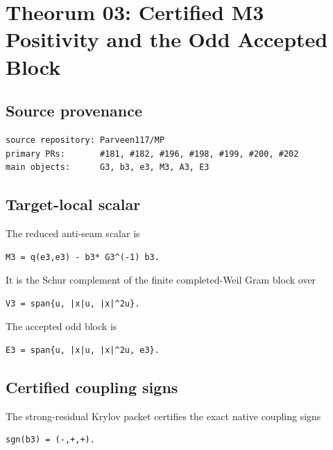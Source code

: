 \hypertarget{theorum-03-certified-m3-positivity-and-the-odd-accepted-block}{%
\chapter{Theorum 03: Certified M3 Positivity and the Odd Accepted Block}\label{theorum-03-certified-m3-positivity-and-the-odd-accepted-block}}

\hypertarget{source-provenance}{%
\section{Source provenance}\label{source-provenance}}

\begin{verbatim}
source repository: Parveen117/MP
primary PRs:       #181, #182, #196, #198, #199, #200, #202
main objects:      G3, b3, e3, M3, A3, E3
\end{verbatim}

\hypertarget{target-local-scalar}{%
\section{Target-local scalar}\label{target-local-scalar}}

The reduced anti-seam scalar is

\begin{verbatim}
M3 = q(e3,e3) - b3* G3^(-1) b3.
\end{verbatim}

It is the Schur complement of the finite completed-Weil Gram block over

\begin{verbatim}
V3 = span{u, |x|u, |x|^2u}.
\end{verbatim}

The accepted odd block is

\begin{verbatim}
E3 = span{u, |x|u, |x|^2u, e3}.
\end{verbatim}

\hypertarget{certified-coupling-signs}{%
\section{Certified coupling signs}\label{certified-coupling-signs}}

The strong-residual Krylov packet certifies the exact native coupling signs

\begin{verbatim}
sgn(b3) = (-,+,+).
\end{verbatim}

